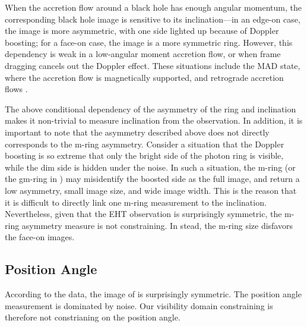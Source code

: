 When the accretion flow around a black hole has enough angular momentum, the corresponding black hole image is sensitive to its inclination---in an edge-on case, the image is more asymmetric, with one side lighted up because of Doppler boosting; for a face-on case, the image is a more symmetric ring.  However, this dependency is weak in a low-angular moment accretion flow, or when frame dragging cancels out the Doppler effect. These situations include the MAD state, where the accretion flow is magnetically supported, and retrograde accretion flows
\citep{2021arXiv210503424M}.

The above conditional dependency of the asymmetry of the ring and
inclination makes it non-trivial to measure inclination from the
observation.
In addition, it is important to note that the asymmetry described
above does not directly corresponds to the m-ring asymmetry.
Consider a situation that the Doppler boosting is so extreme that only
the bright side of the photon ring is visible, while the dim side is
hidden under the noise.
In such a situation, the m-ring (or the gm-ring in )
may misidentify the boosted side as the full image, and return a low
asymmetry, small image size, and wide image width.
This is the reason that it is difficult to directly link one m-ring
measurement to the inclination.
Nevertheless, given that the EHT observation is surprisingly
symmetric, the m-ring asymmetry measure is not constraining.
In stead, the m-ring size disfavors the face-on images.

\subsection{Position Angle}


According to the data, the image of \sgra is surprisingly symmetric.
The position angle measurement is dominated by noise.
Our visibility domain constraining is therefore not constrianing on
the position angle.

